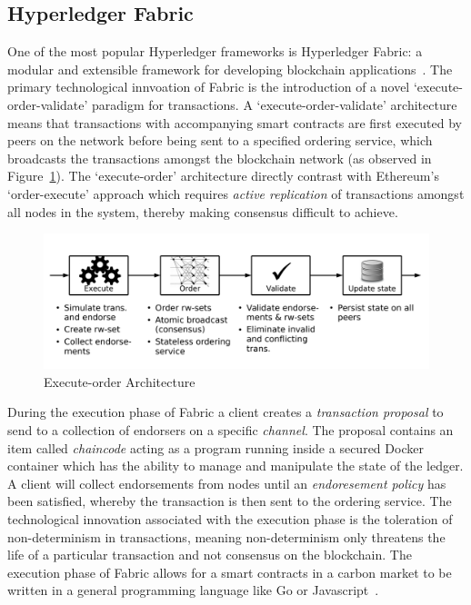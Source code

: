 \subsection{Hyperledger Fabric}
One of the most popular Hyperledger frameworks is Hyperledger Fabric:
a modular and extensible framework for developing blockchain
applications~\cite{And18}. The primary technological innvoation of
Fabric is the introduction of a novel `execute-order-validate' paradigm
for transactions. A `execute-order-validate' architecture means that
transactions with accompanying smart contracts are first
executed by peers on the network before being sent to a specified
ordering service, which broadcasts the transactions amongst the blockchain
network (as observed in Figure~\ref{fig:exe}).
The `execute-order' architecture directly contrast with
Ethereum's `order-execute' approach which requires \textit{active replication}
of transactions amongst all nodes in the system, thereby making consensus
difficult to achieve.

\begin{figure}[ht]
    \centering
    \includegraphics[scale=0.5]{photos/execute.png}
    \caption{Execute-order Architecture}
    \label{fig:exe}
\end{figure}

During the execution phase of Fabric a client creates a \textit{transaction
    proposal} to send to a collection of endorsers on a specific
\textit{channel}. The proposal contains an item called \textit{chaincode}
acting as a program running inside a secured Docker container which has
the ability to manage and manipulate the state of the ledger.
A client will collect endorsements from nodes until an
\textit{endoresement policy} has been satisfied, whereby the transaction
is then sent to the ordering service. The technological innovation
associated with the execution phase is the toleration of
non-determinism in transactions, meaning non-determinism only threatens the
life of a particular transaction and not consensus on the blockchain.
The execution phase of Fabric allows for a smart contracts in a
carbon market to be written
in a general programming language like Go or Javascript~\cite{And18}.

